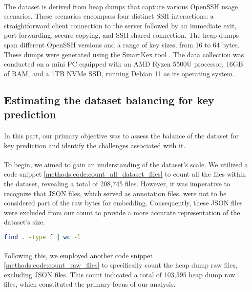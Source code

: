             \paragraph{}The dataset is derived from heap dumps that capture various OpenSSH usage scenarios. These scenarios encompass four distinct SSH interactions: a straightforward client connection to the server followed by an immediate exit, port-forwarding, secure copying, and SSH shared connection. The heap dumps span different OpenSSH versions and a range of key sizes, from 16 to 64 bytes. These dumps were generated using the SmartKex tool \cite{fellicious_smartkex_2022}. The data collection was conducted on a mini PC equipped with an AMD Ryzen 5500U processor, 16GB of RAM, and a 1TB NVMe SSD, running Debian 11 as its operating system.

        \subsection{Estimating the dataset balancing for key prediction}
            \paragraph{}In this part, our primary objective was to assess the balance of the dataset for key prediction and identify the challenges associated with it.

            \paragraph{}To begin, we aimed to gain an understanding of the dataset's scale. We utilized a code snippet \ref{methods:code:count_all_dataset_files} to count all the files within the dataset, revealing a total of 208,745 files. However, it was imperative to recognize that JSON files, which served as annotation files, were not to be considered part of the raw bytes for embedding. Consequently, these JSON files were excluded from our count to provide a more accurate representation of the dataset's size.

            \begin{lstlisting}[caption={Count all dataset files}, label=methods:code:count_all_dataset_files, language=bash]
            find . -type f | wc -l
            \end{lstlisting}

            \paragraph{}Following this, we employed another code snippet \ref{methods:code:count_raw_files} to specifically count the heap dump raw files, excluding JSON files. This count indicated a total of 103,595 heap dump raw files, which constituted the primary focus of our analysis.

